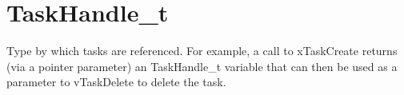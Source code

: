 \hypertarget{group___task_handle__t}{}\section{Task\+Handle\+\_\+t}
\label{group___task_handle__t}
Type by which tasks are referenced. For example, a call to x\+Task\+Create returns (via a pointer parameter) an Task\+Handle\+\_\+t variable that can then be used as a parameter to v\+Task\+Delete to delete the task. 